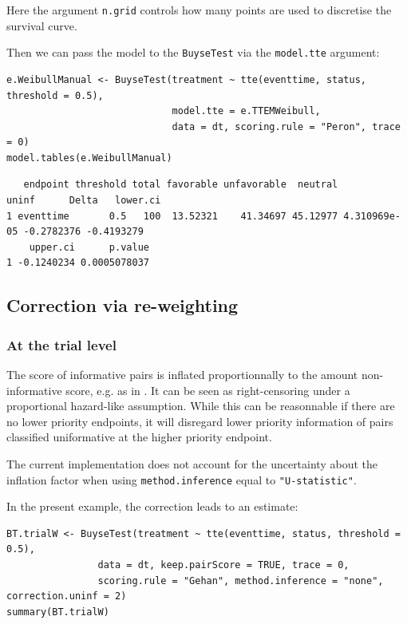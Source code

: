 \documentclass[12pt]{article}
\newcommand\Warning[1][3ex]{%
\renewcommand\stacktype{L}%
\scaleto{\stackon[1.3pt]{\color{red}$\triangle$}{\tiny\bfseries !}}{#1}%
\xspace
}
\begin{document}
Here the argument \texttt{n.grid} controls how many points are used to
discretise the survival curve.


\clearpage

Then we can pass the model to the \texttt{BuyseTest} via the \texttt{model.tte}
argument:
\lstset{language=r,label= ,caption= ,captionpos=b,numbers=none}
\begin{lstlisting}
e.WeibullManual <- BuyseTest(treatment ~ tte(eventtime, status, threshold = 0.5),
                             model.tte = e.TTEMWeibull,
                             data = dt, scoring.rule = "Peron", trace = 0)
model.tables(e.WeibullManual)
\end{lstlisting}
\begin{verbatim}
   endpoint threshold total favorable unfavorable  neutral        uninf      Delta   lower.ci
1 eventtime       0.5   100  13.52321    41.34697 45.12977 4.310969e-05 -0.2782376 -0.4193279
    upper.ci      p.value
1 -0.1240234 0.0005078037
\end{verbatim}


\subsection{Correction via re-weighting \citep{peron2021correcting}}
\label{sec:orgbff698b}

\subsubsection{At the trial level}
\label{sec:org3e8a3bc}

The score of informative pairs is inflated proportionnally to the
amount non-informative score, e.g. as in
\cite{buyse2008reformulating}. It can be seen as right-censoring under a
proportional hazard-like assumption. While this can be reasonnable if
there are no lower priority endpoints, it will disregard lower
priority information of pairs classified uniformative at the higher
priority endpoint. \newline \Warning The current implementation does
not account for the uncertainty about the inflation factor when using
\texttt{method.inference} equal to \texttt{"U-statistic"}.

\bigskip

In the present example, the correction leads to an estimate:
\lstset{language=r,label= ,caption= ,captionpos=b,numbers=none}
\begin{lstlisting}
BT.trialW <- BuyseTest(treatment ~ tte(eventtime, status, threshold = 0.5),
                data = dt, keep.pairScore = TRUE, trace = 0,
                scoring.rule = "Gehan", method.inference = "none", correction.uninf = 2)
summary(BT.trialW)
\end{lstlisting}
\end{document}
